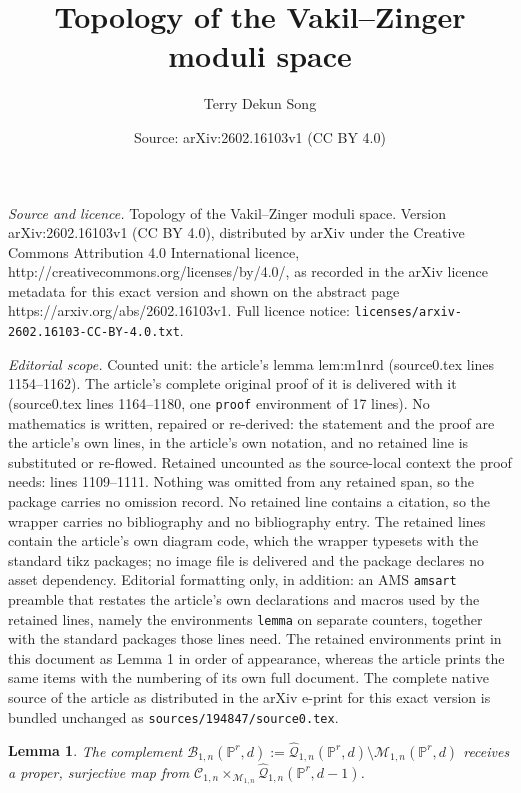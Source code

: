 \documentclass[10pt,a4paper]{amsart}
\title{Topology of the Vakil--Zinger moduli space}
\author{Terry Dekun Song}
\date{Source: arXiv:2602.16103v1 (CC BY 4.0)}
\newtheorem{lemma}{Lemma}
\newcommand{\PP}{\mathbb{P}}
\begin{document}
\maketitle

\noindent\emph{Source and licence.} Topology of the Vakil--Zinger moduli space. Version arXiv:2602.16103v1 (CC BY 4.0), distributed by arXiv under the Creative Commons Attribution 4.0 International licence, http://creativecommons.org/licenses/by/4.0/, as recorded in the arXiv licence metadata for this exact version and shown on the abstract page https://arxiv.org/abs/2602.16103v1. Full licence notice: \texttt{licenses/arxiv-2602.16103-CC-BY-4.0.txt}.\par\smallskip

\noindent\textit{Editorial scope.} Counted unit: the article's lemma lem:m1nrd (source0.tex lines 1154--1162). The article's complete original proof of it is delivered with it (source0.tex lines 1164--1180, one \texttt{proof} environment of 17 lines). No mathematics is written, repaired or re-derived: the statement and the proof are the article's own lines, in the article's own notation, and no retained line is substituted or re-flowed.  Retained uncounted as the source-local context the proof needs: lines 1109--1111.  Nothing was omitted from any retained span, so the package carries no omission record.  No retained line contains a citation, so the wrapper carries no bibliography and no bibliography entry.  The retained lines contain the article's own diagram code, which the wrapper typesets with the standard tikz packages; no image file is delivered and the package declares no asset dependency.  Editorial formatting only, in addition: an AMS \texttt{amsart} preamble that restates the article's own declarations and macros used by the retained lines, namely the environments \texttt{lemma} on separate counters, together with the standard packages those lines need.  The retained environments print in this document as Lemma 1 in order of appearance, whereas the article prints the same items with the numbering of its own full document.  The complete native source of the article as distributed in the arXiv e-print for this exact version is bundled unchanged as \texttt{sources/194847/source0.tex}.
\begin{lemma}\label{lem:propsurj}
  The complement $\mathcal{B}_{1,n}(\mathbb{P}^r,d):= \hat{\mathcal{Q}}_{1,n}(\PP^r,d)\setminus \mathcal{M}_{1,n}(\PP^r,d)$ receives a proper, surjective map from $\mathcal{C}_{1,n}\times_{\mathcal{M}_{1,n}}\hat{\mathcal{Q}}_{1,n}(\mathbb{P}^r,d-1)$.
\end{lemma}
\end{document}
